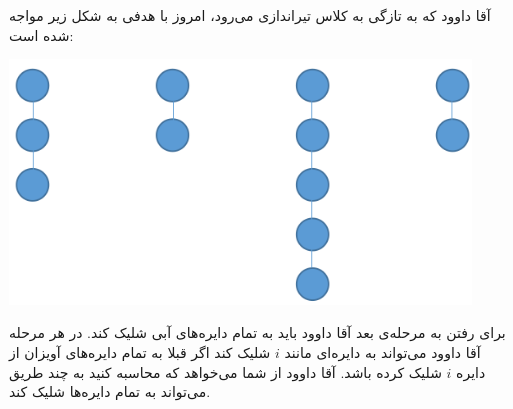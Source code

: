     \p 
آقا داوود که به تازگی به کلاس تیراندازی می‌رود، امروز با هدفی به شکل زیر مواجه شده است:
\begin{center}
\includegraphics[height=6.5cm]{1.png}
\end{center}
برای رفتن به مرحله‌ی بعد آقا داوود باید به تمام دایره‌های آبی شلیک کند. در هر مرحله آقا داوود می‌تواند به دایره‌ای مانند
$i$
شلیک کند اگر قبلا به تمام دایره‌های آویزان از دایره
$i$
شلیک کرده باشد. آقا داوود از شما می‌خواهد که محاسبه کنید به چند طریق می‌تواند به تمام دایره‌ها شلیک کند.